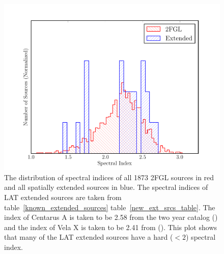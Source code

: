 \documentclass[12pt,preprint]{aastex}
\begin{document}
\clearpage
\begin{figure}
  \begin{center}
    \includegraphics{summary_plots/compare_index_2FGL.pdf}
    \end{center}
    \caption{
    The distribution of spectral indices of all 1873 2FGL sources in
    red and all spatially extended sources in blue. The
    spectral indices of LAT extended sources are taken from
    table~\ref{known_extended_sources} table~\ref{new_ext_srcs_table}.
    The index of Centarus A is taken to be 2.58 from the two year catalog
    (\cite{second_cat}) and the index of Vela X is taken to be 2.41
    from (\cite{velax}). This plot shows that many of the LAT
    extended sources have a hard ($<2$) spectral index.
    }\label{compare_index_2FGL}
  \end{figure}
\end{document}
